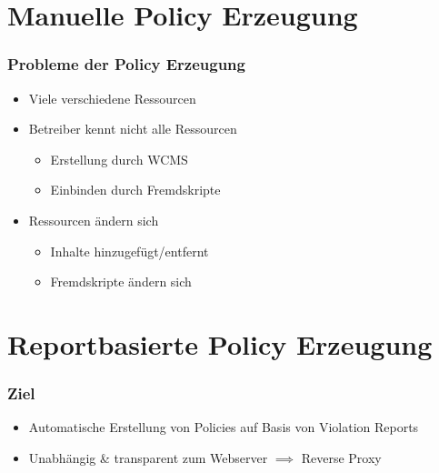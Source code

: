 \documentclass[handout]{beamer}
\begin{document}
\section{Manuelle Policy Erzeugung}
\begin{frame}[c]
\frametitle{Probleme der Policy Erzeugung}
\begin{itemize}
\item Viele verschiedene Ressourcen
\item Betreiber kennt nicht alle Ressourcen
\begin{itemize}
\item Erstellung durch WCMS
\item Einbinden durch Fremdskripte
\end{itemize}
\item Ressourcen ändern sich
\begin{itemize}
\item Inhalte hinzugefügt/entfernt
\item Fremdskripte ändern sich
\end{itemize}
\end{itemize}
\end{frame}

\section{Reportbasierte Policy Erzeugung}

\begin{frame}[c]
\frametitle{Ziel}
\begin{itemize}
\item Automatische Erstellung von Policies auf Basis von Violation Reports
\item Unabhängig \& transparent zum Webserver $\implies$ Reverse Proxy
\end{itemize}
\end{frame}
\end{document}
